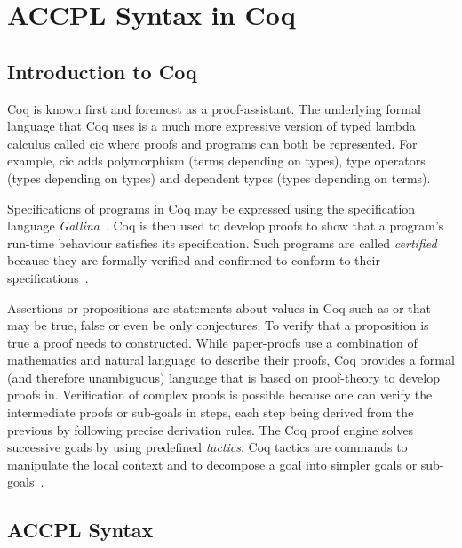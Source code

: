 \chapter{ACCPL Syntax in Coq}\label{chap:odrl0syntaxcoq}

\section{Introduction to Coq}

Coq is known first and foremost as a proof-assistant. The underlying formal language that Coq uses is a much more expressive version of typed lambda calculus called \ac{cic} where proofs and programs can both be represented. For example, \ac{cic} adds polymorphism (terms depending on types), type operators (types depending on types) and dependent types (types depending on terms).

Specifications of programs in Coq may be expressed using the specification language \emph{Gallina}~\cite{gallinaref}. Coq is then used to develop proofs to show that a program's run-time behaviour satisfies its specification. Such programs are called \emph{certified} because they are formally verified and confirmed to conform to their specifications~\cite{BC04}.

Assertions or propositions are statements about values in Coq such as  or  that may be true, false or even be only conjectures. To verify that a proposition is true a proof needs to constructed. While paper-proofs use a combination of mathematics and natural language to describe their proofs, Coq provides a formal (and therefore unambiguous) language that is based on proof-theory to develop proofs in. Verification of complex proofs is possible because one can verify the intermediate proofs or sub-goals in steps, each step being derived from the previous by following precise derivation rules. The Coq proof engine solves successive goals by using predefined \emph{tactics}. Coq tactics are commands to manipulate the local context and to decompose a goal into simpler goals or sub-goals~\cite{BC04}.

\section{ACCPL Syntax}\label{sec:agreementConstructor}

